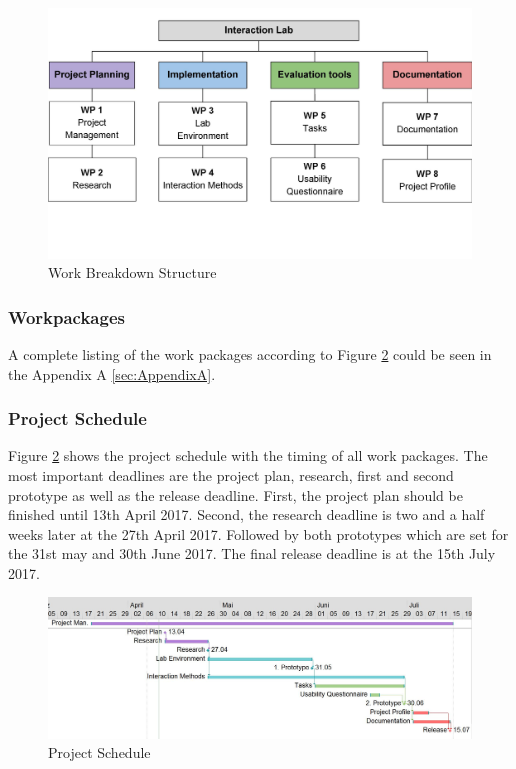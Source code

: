 \begin{figure}[H] 
	\center 
	\includegraphics[width= 15 cm]{Images/WBS.jpg}			
	\caption[]{Work Breakdown Structure}
	\label{fig:wbs}
\end{figure}
\subsubsection{Workpackages}\label{sec:PMWorkpackages}
A complete listing of the work packages according to Figure \ref{fig:wbs} could be seen in the Appendix A \ref{sec:AppendixA}.

\subsubsection{Project Schedule}\label{sec:PMSchedule}

Figure \ref{fig:wbs} shows the project schedule with the timing of all work packages. The most important deadlines are the project plan, research, first and second prototype as well as the release deadline. First, the project plan should be finished until 13th April 2017. Second, the research deadline is two and a half weeks later at the 27th April 2017. Followed by both prototypes which are set for the 31st may and 30th June 2017. The final release deadline is at the 15th July 2017.

\begin{figure}[H] 
	\center 
	\includegraphics[width= 15 cm]{Images/Gantdiagramm.jpg}			
	\caption[]{Project Schedule}
	\label{fig:wbs}
\end{figure}

